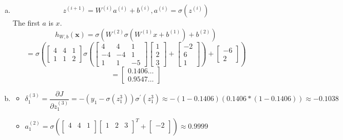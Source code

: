 \documentclass[12pt]{article}
\begin{document}
\begin{enumerate}[(a)]
	\item 
	\[ z^{(i+1)} = W^{(i)}a^{(i)} + b^{(i)}, a^{(i)} = \sigma\left(z^{(i)}\right) \]
	The first $ a $ is $ x $.
	\[h_{W,b}(\mathbf{x}) = \sigma\left(W^{(2)}\sigma\left(W^{(1)}x + b^{(1)}\right)+b^{(2)}\right)\]
	\[ = 
	\sigma \left(
	\begin{bmatrix}
		4 & 4 & 1\\
		1 & 1 & 2
	\end{bmatrix}
	\sigma \left(
	\begin{bmatrix}
		4 & 4 & 1\\
		-4 & -4 & 1\\
		1 & 1 & -5
	\end{bmatrix}
	\begin{bmatrix}
		1\\
		2\\
		3
	\end{bmatrix} 
	+
	\begin{bmatrix}
		-2\\
		6\\
		1
	\end{bmatrix} \right)
+
	\begin{bmatrix}
	-6\\
	2
	\end{bmatrix} \right) \]
	\[ = \begin{bmatrix}
		0.1406\ldots\\
		0.9547\ldots
	\end{bmatrix}
	\]
	
	\item 
	\begin{itemize}
		\item $ \delta_{1}^{(3)} = \dfrac{\partial J}{\partial z_{1}^{(3)}} = -\left(y_1 - \sigma\left(z_{1}^{3}\right)\right)  \sigma^{\prime}\left(z_{1}^{3}\right) \approx -\left(1 - 0.1406\right) \left(0.1406* (1-0.1406)\right) \approx -0.1038$
		
		\item $ a_{1}^{(2)} = \sigma\left( 
			\begin{bmatrix}
				4 & 4 & 1\\
			\end{bmatrix} 
			\begin{bmatrix}
			1 & 2 & 3\\
			\end{bmatrix}
		^T 
		+ 
			\begin{bmatrix}
				-2\\
			\end{bmatrix}
		\right) \approx 0.9999$
		

\end{itemize}
\end{enumerate}
\end{document}
